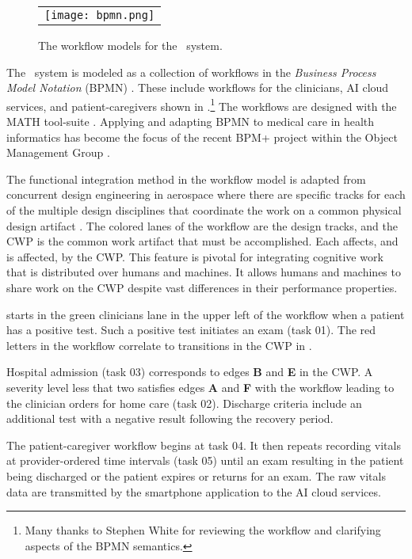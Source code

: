 \begin{figure*}[p]
  \begin{center}
    \begin{tabular}{c}
      \texttt{[image: bpmn.png]}
    \end{tabular}
  \end{center}
\caption{The workflow models for the \phware\ system.}
\label{fig:bpmn}
\end{figure*}

The \phware\ system is modeled as a collection of workflows in the \emph{Business Process Model Notation} (BPMN) \cite{BPMNSpecification}.
These include workflows for the clinicians, AI cloud services, and patient-caregivers shown in .\footnote{Many thanks to Stephen White for reviewing the workflow and clarifying aspects of the BPMN semantics.}
The workflows are designed with the MATH tool-suite \cite{workflowmodel}.
Applying and adapting BPMN to medical care in health informatics has become the focus of the recent BPM+ project within the Object Management Group \cite{bpm}.

The functional integration method in the workflow model is adapted from concurrent design engineering in aerospace where there are specific tracks for each of the multiple design disciplines that coordinate the work on a common physical design artifact \cite{10.1007/978-1-4471-1538-0_9}.
The colored lanes of the workflow are the design tracks, and the CWP is the common work artifact that must be accomplished.
Each affects, and is affected, by the CWP.
This feature is pivotal for integrating cognitive work that is distributed over humans and machines.
It allows humans and machines to share work on the CWP despite vast differences in their performance properties. 

 starts in the green clinicians lane in the upper left of the workflow when a patient has a positive test.
Such a positive test initiates an exam (task 01). The red letters in the workflow correlate to transitions in the CWP in .

Hospital admission (task 03) corresponds to edges \textbf{B} and \textbf{E} in the CWP.
A severity level less that two satisfies edges \textbf{A} and \textbf{F} with the workflow leading to the clinician orders for home care (task 02).
Discharge criteria include an additional test with a negative result following the recovery period.

The patient-caregiver workflow begins at task 04.
It then repeats recording vitals at provider-ordered time intervals (task 05) until an exam resulting in the patient being discharged or the patient expires or returns for an exam.
The raw vitals data are transmitted by the smartphone application to the AI cloud services. 

